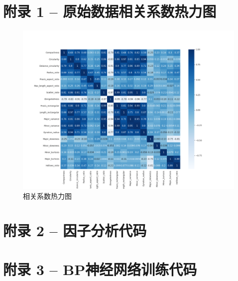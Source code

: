 \documentclass{progartcn}
\begin{document}
\section{附录 1 -- 原始数据相关系数热力图 }
\begin{figure}[H]
	\centering
	\includegraphics[width=0.8\linewidth]{corr.png}
	\caption{\centering 相关系数热力图}
	\label{fig:screenshot001}
\end{figure}

\section{附录 2 -- 因子分析代码 }


\section{附录 3 -- BP神经网络训练代码 }

\end{document}
